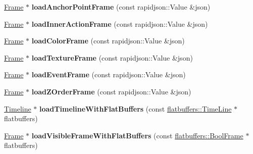 \begin{DoxyCompactItemize}
\hyperlink{structflatbuffers_1_1Frame}{Frame} $\ast$ {\bfseries load\+Anchor\+Point\+Frame} (const rapidjson\+::\+Value \&json)
\item 
\mbox{\label{classActionTimelineCache_a5ccd028cf44881a6e7a0610d6608b151}} 
\hyperlink{structflatbuffers_1_1Frame}{Frame} $\ast$ {\bfseries load\+Inner\+Action\+Frame} (const rapidjson\+::\+Value \&json)
\item 
\mbox{\label{classActionTimelineCache_a93df5cfffcb7b329f78f0696e291e95d}} 
\hyperlink{structflatbuffers_1_1Frame}{Frame} $\ast$ {\bfseries load\+Color\+Frame} (const rapidjson\+::\+Value \&json)
\item 
\mbox{\label{classActionTimelineCache_a3f3886116c1c9f0cd51617a0b032a553}} 
\hyperlink{structflatbuffers_1_1Frame}{Frame} $\ast$ {\bfseries load\+Texture\+Frame} (const rapidjson\+::\+Value \&json)
\item 
\mbox{\label{classActionTimelineCache_aee5c304f65e0349b2a4338b4b8b0e7fc}} 
\hyperlink{structflatbuffers_1_1Frame}{Frame} $\ast$ {\bfseries load\+Event\+Frame} (const rapidjson\+::\+Value \&json)
\item 
\mbox{\label{classActionTimelineCache_a43baece078a232718c9fb15b3ce145cd}} 
\hyperlink{structflatbuffers_1_1Frame}{Frame} $\ast$ {\bfseries load\+Z\+Order\+Frame} (const rapidjson\+::\+Value \&json)
\item 
\mbox{\label{classActionTimelineCache_afd385ff767d1d2156e719dcb2531de64}} 
\hyperlink{classTimeline}{Timeline} $\ast$ {\bfseries load\+Timeline\+With\+Flat\+Buffers} (const \hyperlink{structflatbuffers_1_1TimeLine}{flatbuffers\+::\+Time\+Line} $\ast$flatbuffers)
\item 
\mbox{\label{classActionTimelineCache_aa90d2cb7b930f82481b63aaf357ae282}} 
\hyperlink{structflatbuffers_1_1Frame}{Frame} $\ast$ {\bfseries load\+Visible\+Frame\+With\+Flat\+Buffers} (const \hyperlink{structflatbuffers_1_1BoolFrame}{flatbuffers\+::\+Bool\+Frame} $\ast$flatbuffers)
\item 
\mbox{\label{classActionTimelineCache_a6bd97d02cbbbab1ea8af7614581dc11c}} 

\end{DoxyCompactItemize}
